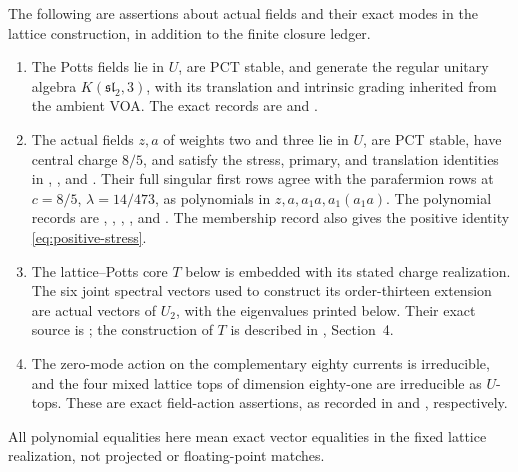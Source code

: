 \begin{certificate}
\label{cert:structural-inputs}
The following are assertions about actual fields and their exact modes
in the lattice construction, in addition to the finite closure ledger.
\begin{enumerate}
\item The Potts fields lie in $U$, are PCT stable, and generate the
regular unitary algebra $K(\mathfrak{sl}_2,3)$, with its translation
and intrinsic grading inherited from the ambient VOA. The exact
records are  and
.
\item The actual fields $z,a$ of weights two and three lie in $U$,
are PCT stable, have central charge $8/5$, and satisfy the stress,
primary, and translation identities in
,
, and
.
Their full singular first rows agree with the parafermion rows at
$c=8/5$, $\lambda=14/473$, as polynomials in $z,a,a_1a,a_1(a_1a)$.
The polynomial records are
,
,
,
, and
.
The membership record also gives the positive identity
\eqref{eq:positive-stress}.
\item The lattice--Potts core $T$ below is embedded with its stated
charge realization. The six joint spectral vectors used to construct
its order-thirteen extension are actual vectors of $U_2$, with the
eigenvalues printed below. Their exact source is
; the
construction of $T$ is described in
, Section~4.
\item The zero-mode action on the complementary eighty currents is
irreducible, and the four mixed lattice tops of dimension eighty-one
are irreducible as $U$-tops. These are exact
field-action assertions, as recorded in
 and
, respectively.
\end{enumerate}
All polynomial equalities here mean exact vector equalities in the
fixed lattice realization, not projected or floating-point matches.
\end{certificate}


